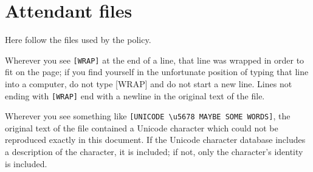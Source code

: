 \chapter{Attendant files}
\label{AttendantFiles}
Here follow the files used by the policy.

Wherever you see \verb![WRAP]! at the end of a line, that line was wrapped
in order to fit on the page; if you find yourself in the unfortunate
position of typing that line into a computer, do not type [WRAP] and do
not start a new line. Lines not ending with \verb![WRAP]! end with a
newline in the original text of the file.

Wherever you see something like \verb![UNICODE \u5678 MAYBE SOME WORDS]!,
the original text of the file contained a Unicode character which could
not be reproduced exactly in this document. If the Unicode character
database includes a description of the character, it is included; if not,
only the character's identity is included.


